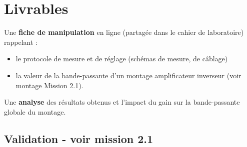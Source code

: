 \section{Livrables}


Une \textbf{fiche de manipulation} en ligne (partagée dans le cahier de laboratoire) rappelant :

\begin{itemize}
	\item le protocole de mesure et de réglage (schémas de mesure, de câblage)
	\item la valeur de la bande-passante d'un montage amplificateur inverseur (voir montage Mission 2.1).
\end{itemize}

Une \textbf{analyse} des résultats obtenus et l'impact du gain sur la bande-passante globale du montage.



\subsection{Validation - voir mission 2.1}

